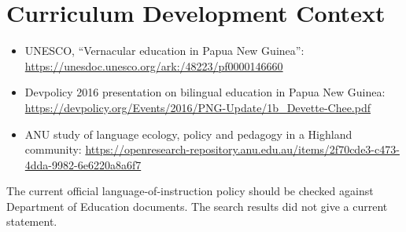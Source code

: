 \documentclass[12pt]{article}
\begin{document}
\section{Curriculum Development Context}
\begin{itemize}
\item UNESCO, ``Vernacular education in Papua New Guinea'': \url{https://unesdoc.unesco.org/ark:/48223/pf0000146660}
\item Devpolicy 2016 presentation on bilingual education in Papua New Guinea: \url{https://devpolicy.org/Events/2016/PNG-Update/1b_Devette-Chee.pdf}
\item ANU study of language ecology, policy and pedagogy in a Highland community: \url{https://openresearch-repository.anu.edu.au/items/2f70cde3-c473-4dda-9982-6e6220a8a6f7}
\end{itemize}
The current official language-of-instruction policy should be checked against Department of Education documents. The search results did not give a current statement.
\end{document}
